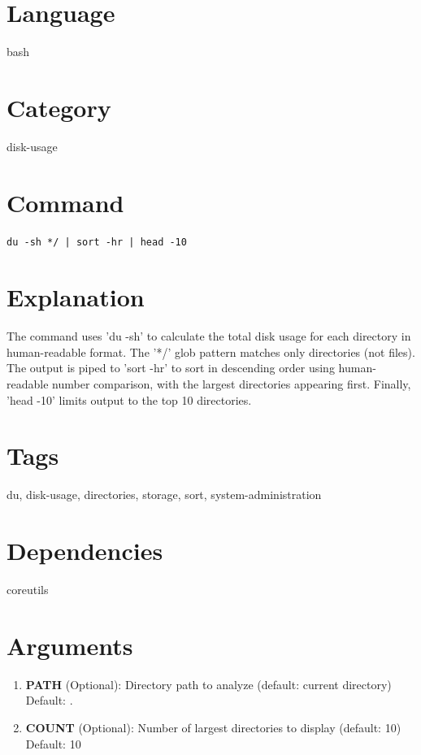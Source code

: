 \documentclass[openany]{book}
\begin{document}
\section*{Language}
bash

\section*{Category}
disk-usage

\section*{Command}
\begin{lstlisting}
du -sh */ | sort -hr | head -10
\end{lstlisting}

\section*{Explanation}
The command uses 'du -sh' to calculate the total disk usage for each directory in human-readable format. The '*/' glob pattern matches only directories (not files). The output is piped to 'sort -hr' to sort in descending order using human-readable number comparison, with the largest directories appearing first. Finally, 'head -10' limits output to the top 10 directories.

\section*{Tags}
du, disk-usage, directories, storage, sort, system-administration

\section*{Dependencies}
coreutils


\section*{Arguments}
\begin{enumerate}
  \item \textbf{PATH} (Optional): Directory path to analyze (default: current directory) \\ Default: .
  \item \textbf{COUNT} (Optional): Number of largest directories to display (default: 10) \\ Default: 10
\end{enumerate}
\end{document}
